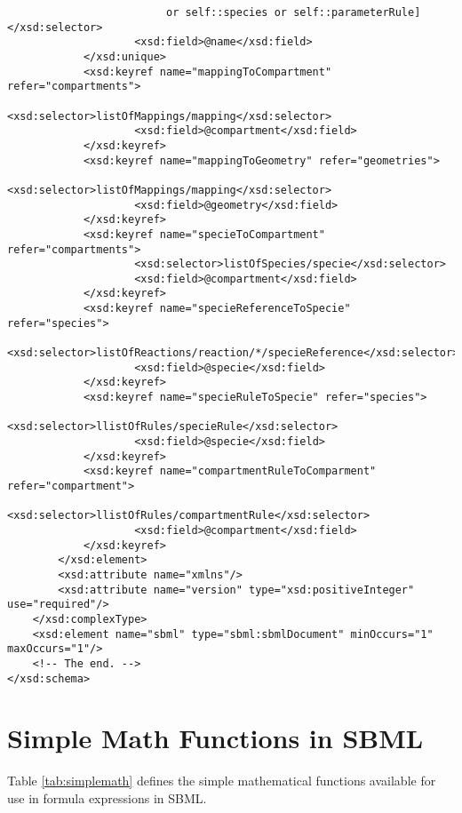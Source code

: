 \documentclass[10pt]{cek-article}
\begin{document}
\begin{small}
\begin{verbatim}
                         or self::species or self::parameterRule]</xsd:selector>
                    <xsd:field>@name</xsd:field>
            </xsd:unique>
            <xsd:keyref name="mappingToCompartment" refer="compartments">
                    <xsd:selector>listOfMappings/mapping</xsd:selector>
                    <xsd:field>@compartment</xsd:field>
            </xsd:keyref>
            <xsd:keyref name="mappingToGeometry" refer="geometries">
                    <xsd:selector>listOfMappings/mapping</xsd:selector>
                    <xsd:field>@geometry</xsd:field>
            </xsd:keyref>
            <xsd:keyref name="specieToCompartment" refer="compartments">
                    <xsd:selector>listOfSpecies/specie</xsd:selector>
                    <xsd:field>@compartment</xsd:field>
            </xsd:keyref>
            <xsd:keyref name="specieReferenceToSpecie" refer="species">
                    <xsd:selector>listOfReactions/reaction/*/specieReference</xsd:selector>
                    <xsd:field>@specie</xsd:field>
            </xsd:keyref>
            <xsd:keyref name="specieRuleToSpecie" refer="species">
                    <xsd:selector>llistOfRules/specieRule</xsd:selector>
                    <xsd:field>@specie</xsd:field>
            </xsd:keyref>
            <xsd:keyref name="compartmentRuleToComparment" refer="compartment">
                    <xsd:selector>llistOfRules/compartmentRule</xsd:selector>
                    <xsd:field>@compartment</xsd:field>
            </xsd:keyref>
        </xsd:element>
        <xsd:attribute name="xmlns"/>
        <xsd:attribute name="version" type="xsd:positiveInteger" use="required"/>
    </xsd:complexType>
    <xsd:element name="sbml" type="sbml:sbmlDocument" minOccurs="1" maxOccurs="1"/>
    <!-- The end. -->
</xsd:schema>
\end{verbatim}
\regularspacing
\end{small}

\section{Simple Math Functions in SBML}
\label{appendix:simplemath}

Table \ref{tab:simplemath} defines the simple mathematical functions
available for use in formula expressions in SBML.
\end{document}
